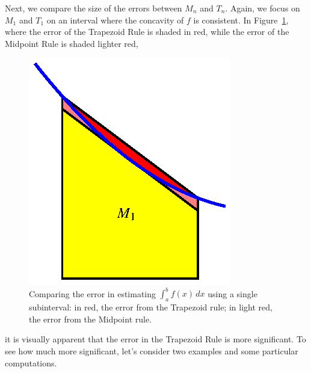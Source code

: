 Next, we compare the size of the errors between $M_n$ and $T_n$.  Again, we focus on $M_1$ and $T_1$ on an interval where the concavity of $f$ is consistent.  In Figure~\ref{F:5.6.MidTrapError}, where the error of the Trapezoid Rule is shaded in red, while the error of the Midpoint Rule is shaded lighter red,  
\begin{figure}[h]
\begin{center}
\includegraphics{figures/5_6_MidTrapError.eps}
\caption{Comparing the error in estimating $\int_a^b f(x) \, dx$ using a single subinterval: in red, the error from the Trapezoid rule; in light red, the error from the Midpoint rule.} 
\label{F:5.6.MidTrapError}
\end{center}
\end{figure}
it is visually apparent that the error in the Trapezoid Rule is more significant.  To see how much more significant, let's consider two examples and some particular computations.  


